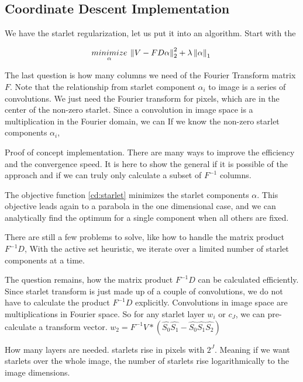 \subsection{Coordinate Descent Implementation}
We have the starlet regularization, let us put it into an algorithm. Start with the 

\begin{equation}\label{cd:starlet}
\underset{\alpha}{minimize} \: \left \| V - FD\alpha \right \|_2^2 + \lambda \left \| \alpha \right \|_1 \\
\end{equation}

The last question is how many columns we need of the Fourier Transform matrix $F$. Note that the relationship from starlet component $\alpha_i$ to image is a series of convolutions. We just need the Fourier transform for pixels, which are in the center of the non-zero starlet. Since a convolution in image space is a multiplication in the Fourier domain, we can 
If we know the non-zero starlet components $\alpha_i$, 


Proof of concept implementation. There are many ways to improve the efficiency and the convergence speed. It is here to show  the general if it is possible of the approach and if we can truly only calculate a subset of $F^{-1}$ columns.

The objective function \eqref{cd:starlet} minimizes the starlet components $\alpha$. This objective leads again to a parabola in the one dimensional case, and we can analytically find the optimum for a single component when all others are fixed. 



There are still a few problems to solve, like how to handle the matrix product $F^{-1}D$, 
With the active set heuristic, we iterate over a limited number of starlet components at a time. 

The question remains, how the matrix product $F^{-1}D$ can be calculated efficiently. Since starlet transform is just made up of a couple of convolutions, we do not have to calculate the product $F^{-1}D$ explicitly. Convolutions in image space are multiplications in Fourier space. 
So for any starlet layer $w_i$ or $c_J$, we can pre-calculate a transform vector. 
$w_2 = F^{-1}V * (\hat{S_0}\hat{S_1} - \hat{S_0}\hat{S_1}\hat{S_2})$

How many layers are needed. starlets rise in pixels with $2^J$. Meaning if we want starlets over the whole image, the number of starlets rise logarithmically to the image dimensions.

